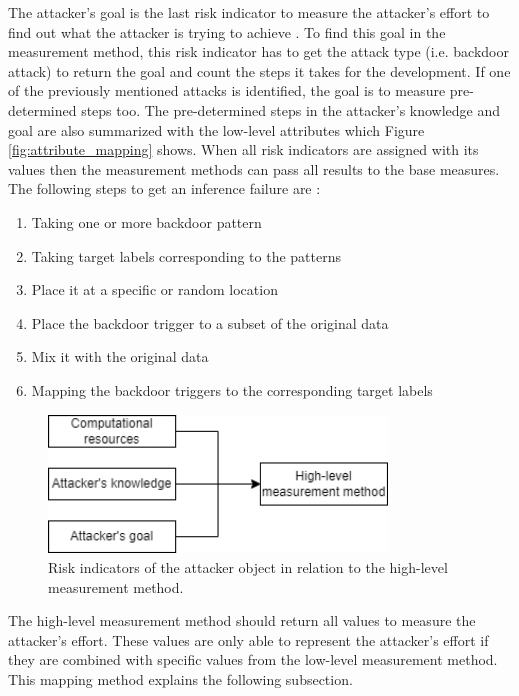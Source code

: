 The attacker's goal is the last risk indicator to measure the attacker's effort to find out what the attacker is trying to achieve \cite{DBLP:journals/corr/abs-2012-04884}. To find this goal in the measurement method, this risk indicator has to get the attack type (i.e. backdoor attack) to return the goal and count the steps it takes for the development. If one of the previously mentioned attacks is identified, the goal is to measure pre-determined steps too. The pre-determined steps in the attacker's knowledge and goal are also summarized with the low-level attributes which Figure \ref{fig:attribute_mapping} shows. When all risk indicators are assigned with its values then the measurement methods can pass all results to the base measures. The following steps to get an inference failure are \cite{DBLP:journals/corr/abs-2003-03675}:

\begin{enumerate}
  \item Taking one or more backdoor pattern
  \item Taking target labels corresponding to the patterns
  \item Place it at a specific or random location
  \item Place the backdoor trigger to a subset of the original data
  \item Mix it with the original data
  \item Mapping the backdoor triggers to the corresponding target labels
\end{enumerate}

\begin{figure}[ht!]
  \centering
  \includegraphics[width=9cm]{pictures/measure_effort.png}
  \caption{Risk indicators of the attacker object in relation to the high-level measurement method.}
  \label{fig:measure_effort}
\end{figure}

The high-level measurement method should return all values to measure the attacker's effort. These values are only able to represent the attacker's effort if they are combined with specific values from the low-level measurement method. This mapping method explains the following subsection.

